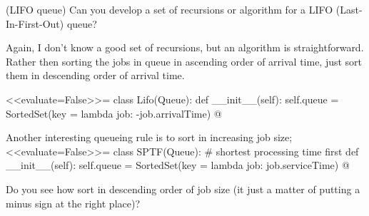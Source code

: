 \begin{question}(LIFO queue) Can you develop a set of recursions or
  algorithm for a LIFO (Last-In-First-Out) queue?
  \begin{solution}
    Again, I don't know a good set of recursions, but an algorithm is
    straightforward. Rather then sorting the jobs in queue in
    ascending order of arrival time, just sort them in descending
    order of arrival time. 


<<evaluate=False>>=
class Lifo(Queue):
    def __init__(self):
        self.queue = SortedSet(key = lambda job: -job.arrivalTime)
@

Another interesting queueing rule is to sort in increasing job size;
<<evaluate=False>>=
  class SPTF(Queue): # shortest processing time first
    def __init__(self):
        self.queue = SortedSet(key = lambda job: job.serviceTime)
@

Do you see how sort in descending order of job size (it just a matter
of putting a minus sign at the right place)?
  \end{solution}
\end{question}


